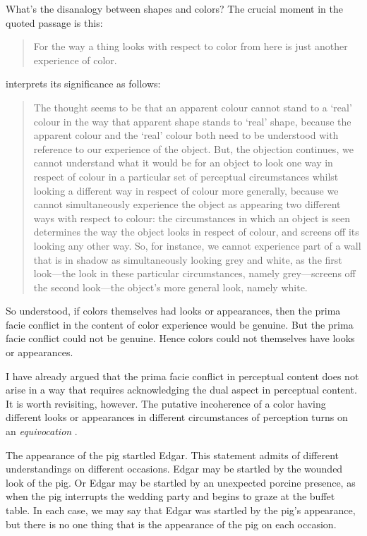 \documentclass[12pt]{article}
\begin{document}
What's the disanalogy between shapes and colors? The crucial moment in the quoted passage is this:
	\begin{quote}
		For the way a thing looks with respect to color from here is just another experience of color. \citep[133]{Noe:2004fk}
	\end{quote}
\citet{Allen:2008kx} interprets its significance as follows:
	\begin{quote}
		The thought seems to be that an apparent colour cannot stand to a ‘real’ colour in the way that apparent shape stands to ‘real’ shape, because the apparent colour and the ‘real’ colour both need to be understood with reference to our experience of the object. But, the objection continues, we cannot understand what it would be for an object to look one way in respect of colour in a particular set of perceptual circumstances whilst looking a different way in respect of colour more generally, because we cannot simultaneously experience the object as appearing two different ways with respect to colour: the circumstances in which an object is seen determines the way the object looks in respect of colour, and screens off its looking any other way. So, for instance, we cannot experience part of a wall that is in shadow as simultaneously looking grey and white, as the first look---the look in these particular circumstances, namely grey---screens off the second look---the object’s more general look, namely white.
	\end{quote}
So understood, if colors themselves had looks or appearances, then the prima facie conflict in the content of color experience would be genuine. But the prima facie conflict could not be genuine. Hence colors could not themselves have looks or appearances.

I have already argued that the prima facie conflict in perceptual content does not arise in a way that requires acknowledging the dual aspect in perceptual content. It is worth revisiting, however. The putative incoherence of a color having different looks or appearances in different circumstances of perception turns on an \emph{equivocation} \citep[though I develop the point in a different way, the present point is essentially due to][48]{Chisholm:1957dq}. 

The appearance of the pig startled Edgar. This statement admits of different understandings on different occasions. Edgar may be startled by the wounded look of the pig. Or Edgar may be startled by an unexpected porcine presence, as when the pig interrupts the wedding party and begins to graze at the buffet table. In each case, we may say that Edgar was startled by the pig's appearance, but there is no one thing that is the appearance of the pig on each occasion. 
\end{document}
